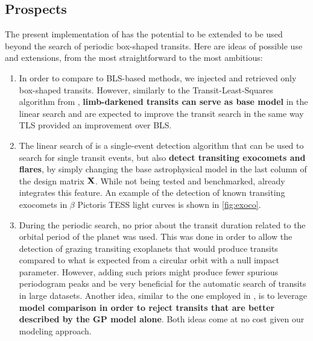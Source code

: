 \documentclass[modern]{aastex631}
\begin{document}
\subsection{Prospects}
The present implementation of \nuancemethod{} has the potential to be extended to be used beyond the search of periodic box-shaped transits. Here are ideas of possible use and extensions, from the most straightforward to the most ambitious:
\begin{enumerate}
    \item In order to compare \nuancecode{} to BLS-based methods, we injected and retrieved only box-shaped transits. However, similarly to the Transit-Least-Squares algorithm from \cite{tls}, \textbf{limb-darkened transits can serve as base model} in the linear search and are expected to improve the transit search in the same way TLS provided an improvement over BLS.
    \item The linear search of \nuancemethod{} is a single-event detection algorithm that can be used to search for single transit events, but also \textbf{detect transiting exocomets and flares}, by simply changing the base astrophysical model in the last column of the design matrix $\bf{X}$. While not being tested and benchmarked, \nuancecode{} already integrates this feature. An example of the detection of known transiting exocomets in $\beta$ Pictoris TESS light curves is shown in \autoref{fig:exoco}.
    \item During the periodic search, no prior about the transit duration related to the orbital period of the planet was used. This was done in order to allow the detection of grazing transiting exoplanets that would produce  transits compared to what is expected from a circular orbit with a null impact parameter. However, adding such priors might produce fewer spurious periodogram peaks and be very beneficial for the automatic search of transits in large datasets. Another idea, similar to the one employed in \cite{foreman2016}, is to leverage \textbf{model comparison in order to reject transits that are better described by the GP model alone}. Both ideas come at no cost given our modeling approach.

\end{enumerate}
\end{document}
